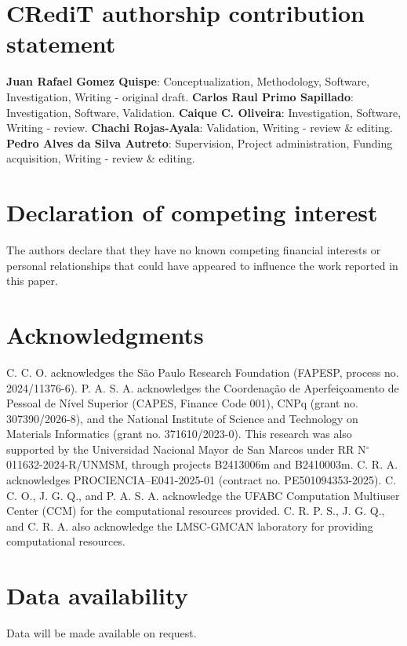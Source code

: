 \documentclass[journal=jacsat,manuscript=article]{achemso}
\begin{document}
\section*{CRediT authorship contribution statement}
\begin{sloppypar}
    \textbf{Juan Rafael Gomez Quispe}: Conceptualization, Methodology, Software, Investigation, Writing - original draft. \textbf{Carlos Raul Primo Sapillado}: Investigation, Software, Validation. \textbf{Caique C. Oliveira}: Investigation, Software, Writing - review. \textbf{Chachi Rojas-Ayala}: Validation, Writing - review \& editing. \textbf{Pedro Alves da Silva Autreto}: Supervision, Project administration, Funding acquisition, Writing - review \& editing.
\end{sloppypar}

\section*{Declaration of competing interest}
The authors declare that they have no known competing financial interests or personal relationships that could have appeared to influence the work reported in this paper.

\section*{Acknowledgments}

C. C. O. acknowledges the S\~ao Paulo Research Foundation (FAPESP, process no. 2024/11376-6). P. A. S. A. acknowledges the Coordena\c{c}\~ao de Aperfei\c{c}oamento de Pessoal de N\'ivel Superior (CAPES, Finance Code 001), CNPq (grant no. 307390/2026-8), and the National Institute of Science and Technology on Materials Informatics (grant no. 371610/2023-0). This research was also supported by the Universidad Nacional Mayor de San Marcos under RR N$^\circ$ 011632-2024-R/UNMSM, through projects B2413006m and B2410003m. C. R. A. acknowledges PROCIENCIA--E041-2025-01 (contract no. PE501094353-2025). C. C. O., J. G. Q., and P. A. S. A. acknowledge the UFABC Computation Multiuser Center (CCM) for the computational resources provided. C. R. P. S., J. G. Q., and C. R. A. also acknowledge the LMSC-GMCAN laboratory for providing computational resources.

\section*{Data availability}

Data will be made available on request.


\end{document}
